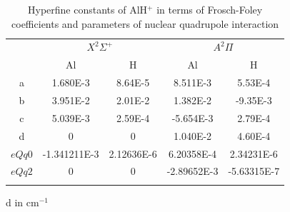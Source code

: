 \documentclass[nofootinbib,aip,jcp,reprint]{revtex4-1}
\begin{document}
\begin{center}
\begin{table}[htbp!]
\let\TPToverlap=\TPTrlap
\caption{Hyperfine constants of AlH$^{+}$ in terms of Frosch-Foley coefficients and parameters of nuclear quadrupole interaction}
\renewcommand{\arraystretch}{1.5}
\begin{threeparttable}
\setlength{\tabcolsep}{6pt}
\begin{tabular}{*{5}{c}}
\hline\colrule
\multirow{2}{*}{Constant} &\multicolumn{2}{c}{$X^2\Sigma^+$} &\multicolumn{2}{c}{$A^2\Pi$} \\
\cline {2-5}
&Al &H  &Al &H\\
 \hline\colrule
a               &\num{1.680E-3}           &\num{8.64E-5}            &\num{8.511E-3}              &\num{5.53E-4}         \\
b               &\num{3.951E-2}           &\num{2.01E-2}             &\num{1.382E-2}             &\num{-9.35E-3}         \\
c               &\num{5.039E-3}          &\num{2.59E-4}             &\num{-5.654E-3}            &\num{2.79E-4}         \\
d               &\num{0}                        &\num{0}                         &\num{1.040E-2}             &\num{4.60E-4}          \\
$eQq0$    &\num{-1.341211E-3}    &\num{2.12636E-6}        &\num{6.20358E-4}       &\num{2.34231E-6}      \\
$eQq2$    &\num{0}                        &\num{0}                          &\num{-2.89652E-3}    &\num{-5.63315E-7}     \\               
\botrule
\end{tabular}
\begin{tablenotes}
\item[d] in cm$^{-1}$
\end{tablenotes}
\end{threeparttable}
\label{hyperfineconstant}
\end{table}
\end{center}
\end{document}
